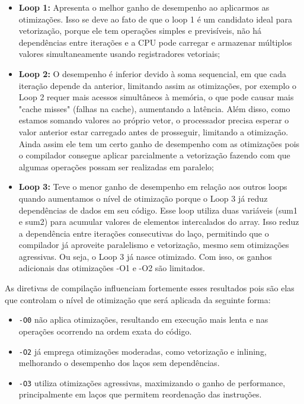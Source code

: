 \documentclass[a4paper, 12pt]{article}
\begin{document}
	\begin{itemize}
		\item \textbf{Loop 1:} Apresenta o melhor ganho de desempenho ao aplicarmos as otimizações. Isso se deve ao fato de que o loop 1 é um candidato ideal para vetorização, porque ele tem operações simples e previsíveis, não há dependências entre iterações e a CPU pode carregar e armazenar múltiplos valores simultaneamente usando registradores vetoriais;
		
		\item \textbf{Loop 2:} O desempenho é inferior devido à soma sequencial, em que cada iteração depende da anterior, limitando assim as otimizações, por exemplo o Loop 2 requer mais acessos simultâneos à memória, o que pode causar mais "cache misses" (falhas na cache), aumentando a latência. Além disso, como estamos somando valores ao próprio vetor, o processador precisa esperar o valor anterior estar carregado antes de prosseguir, limitando a otimização. Ainda assim ele tem um certo ganho de desempenho com as otimizações pois o compilador consegue aplicar parcialmente a vetorização fazendo com que algumas operações possam ser realizadas em paralelo;
		
		\item \textbf{Loop 3:} Teve o menor ganho de desempenho em relação aos outros loops quando aumentamos o nível de otimização porque o Loop 3 já reduz dependências de dados em seu código. Esse loop utiliza duas variáveis (sum1 e sum2) para acumular valores de elementos intercalados do array. Isso reduz a dependência entre iterações consecutivas do laço, permitindo que o compilador já aproveite paralelismo e vetorização, mesmo sem otimizações agressivas. Ou seja, o Loop 3 já nasce otimizado. Com isso, os ganhos adicionais das otimizações -O1 e -O2 são limitados.
	\end{itemize}
	
	As diretivas de compilação influenciam fortemente esses resultados pois são elas que controlam o nível de otimização que será aplicada da seguinte forma:
	
	\begin{itemize}
		\item \texttt{-O0} não aplica otimizações, resultando em execução mais lenta e nas operações ocorrendo na ordem exata do código.
		\item \texttt{-O2} já emprega otimizações moderadas, como vetorização e inlining, melhorando o desempenho dos laços sem dependências.
		\item \texttt{-O3} utiliza otimizações agressivas, maximizando o ganho de performance, principalmente em laços que permitem reordenação das instruções.
	\end{itemize}
	
\end{document}
